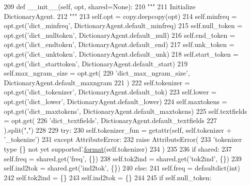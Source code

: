 \begin{DoxyCode}
209     \textcolor{keyword}{def }\_\_init\_\_(self, opt, shared=None):
210         \textcolor{stringliteral}{"""}
211 \textcolor{stringliteral}{        Initialize DictionaryAgent.}
212 \textcolor{stringliteral}{        """}
213         self.opt = copy.deepcopy(opt)
214         self.minfreq = opt.get(\textcolor{stringliteral}{'dict\_minfreq'}, DictionaryAgent.default\_minfreq)
215         self.null\_token = opt.get(\textcolor{stringliteral}{'dict\_nulltoken'}, DictionaryAgent.default\_null)
216         self.end\_token = opt.get(\textcolor{stringliteral}{'dict\_endtoken'}, DictionaryAgent.default\_end)
217         self.unk\_token = opt.get(\textcolor{stringliteral}{'dict\_unktoken'}, DictionaryAgent.default\_unk)
218         self.start\_token = opt.get(\textcolor{stringliteral}{'dict\_starttoken'}, DictionaryAgent.default\_start)
219         self.max\_ngram\_size = opt.get(
220             \textcolor{stringliteral}{'dict\_max\_ngram\_size'}, DictionaryAgent.default\_maxngram
221         )
222         self.tokenizer = opt.get(\textcolor{stringliteral}{'dict\_tokenizer'}, DictionaryAgent.default\_tok)
223         self.lower = opt.get(\textcolor{stringliteral}{'dict\_lower'}, DictionaryAgent.default\_lower)
224         self.maxtokens = opt.get(\textcolor{stringliteral}{'dict\_maxtokens'}, DictionaryAgent.default\_maxtokens)
225         self.textfields = opt.get(
226             \textcolor{stringliteral}{'dict\_textfields'}, DictionaryAgent.default\_textfields
227         ).split(\textcolor{stringliteral}{","})
228 
229         \textcolor{keywordflow}{try}:
230             self.tokenizer\_fun = getattr(self, self.tokenizer + \textcolor{stringliteral}{'\_tokenize'})
231         \textcolor{keywordflow}{except} AttributeError:
232             \textcolor{keywordflow}{raise} AttributeError(
233                 \textcolor{stringliteral}{'tokenizer type \{\} not yet supported'}.\hyperlink{namespaceparlai_1_1chat__service_1_1services_1_1messenger_1_1shared__utils_a32e2e2022b824fbaf80c747160b52a76}{format}(self.tokenizer)
234             )
235 
236         \textcolor{keywordflow}{if} shared:
237             self.freq = shared.get(\textcolor{stringliteral}{'freq'}, \{\})
238             self.tok2ind = shared.get(\textcolor{stringliteral}{'tok2ind'}, \{\})
239             self.ind2tok = shared.get(\textcolor{stringliteral}{'ind2tok'}, \{\})
240         \textcolor{keywordflow}{else}:
241             self.freq = defaultdict(int)
242             self.tok2ind = \{\}
243             self.ind2tok = \{\}
244 
245             \textcolor{keywordflow}{if} self.null\_token:

\end{DoxyCode}
